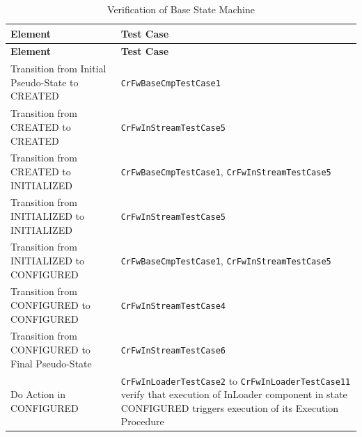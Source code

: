 \documentclass[a4paper,10pt]{article}
\begin{document}
\begin{longtable}{|>{\raggedright}p{6.0cm}|P{5.0cm}|}
\caption{Verification of Base State Machine}
\label{tab:verBaseSM}\\
\hline
{}
\textbf{Element} & \textbf{Test Case} \\
\hline
\endfirsthead
{}
\textbf{Element} & \textbf{Test Case} \\
\hline
\endhead
Transition from Initial Pseudo-State to CREATED  & \texttt{CrFwBaseCmpTestCase1}\\
\hline
Transition from CREATED to CREATED  & \texttt{CrFwInStreamTestCase5}\\
\hline
Transition from CREATED to INITIALIZED  & \texttt{CrFwBaseCmpTestCase1}, \texttt{CrFwInStreamTestCase5}\\
\hline
Transition from INITIALIZED to INITIALIZED  & \texttt{CrFwInStreamTestCase5}\\
\hline
Transition from INITIALIZED to CONFIGURED  & \texttt{CrFwBaseCmpTestCase1}, \texttt{CrFwInStreamTestCase5}\\
\hline
Transition from CONFIGURED to CONFIGURED  & \texttt{CrFwInStreamTestCase4}\\
\hline
Transition from CONFIGURED to Final Pseudo-State  & \texttt{CrFwInStreamTestCase6}\\
\hline
Do Action in CONFIGURED & \texttt{CrFwInLoaderTestCase2} to \texttt{CrFwInLoaderTestCase11} verify that execution of InLoader component in state CONFIGURED triggers execution of its Execution Procedure \\
\hline
\end{longtable}
\end{document}

